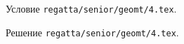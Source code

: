 \problem
Условие \texttt{regatta/senior/geomt/4.tex}.

\solution Решение \texttt{regatta/senior/geomt/4.tex}.
\endproblem
